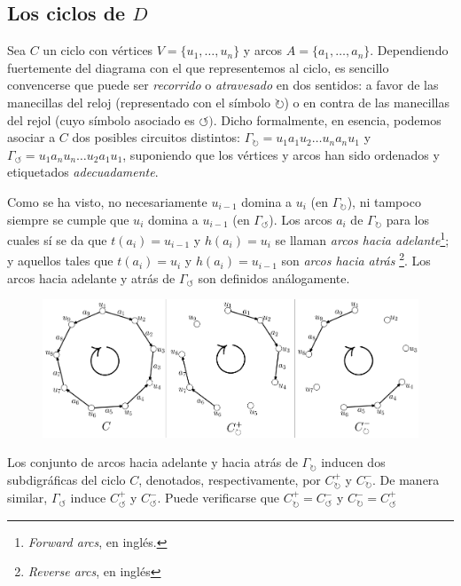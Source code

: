  \subsection{Los ciclos de $D$}
 
Sea $C$ un ciclo con vértices $V=\{u_{1}, \ldots, u_{n}\}$ y arcos $A=\{a_{1},\ldots, a_{n}\}$. Dependiendo fuertemente del diagrama con el que representemos al ciclo, es sencillo convencerse que puede ser \textit{recorrido} o \textit{atravesado} en dos sentidos: a favor de las manecillas del reloj (representado con el símbolo $\mathbf{\circlearrowright}$) o en contra de las manecillas del rejol (cuyo símbolo asociado es $\mathbf{\circlearrowleft})$. Dicho formalmente, en esencia, podemos asociar a $C$ dos posibles circuitos distintos: $\Gamma_{\mathbf{\circlearrowright}}=u_{1}a_{1}u_{2}\ldots u_{n}a_{n}u_{1}$ y $\Gamma_{\mathbf{\circlearrowleft}}=u_{1}a_{n}u_{n}\ldots u_{2}a_{1}u_{1}$, suponiendo que los vértices y arcos han sido ordenados y etiquetados \textit{adecuadamente}.

Como se ha visto, no necesariamente $u_{i-1}$ domina a $u_{i}$ (en $\Gamma_{\mathbf{\circlearrowright}}$), ni tampoco siempre se cumple que  $u_{i}$ domina a $u_{i-1}$ (en $\Gamma_{\mathbf{\circlearrowleft}}$). Los arcos $a_{i}$ de $\Gamma_{\mathbf{\circlearrowright}}$ para los cuales sí se da que $t(a_{i}) = u_{i-1}$ y $h(a_{i})=u_{i}$ se llaman \textit{arcos hacia adelante}\footnote{\textit{Forward arcs}, en inglés.}; y aquellos tales que $t(a_{i})=u_{i}$ y $h(a_{i})=u_{i-1}$ son \textit{arcos hacia atrás} \footnote{\textit{Reverse arcs}, en inglés}. Los arcos hacia adelante y atrás de $\Gamma_{\mathbf{\circlearrowleft}}$ son definidos análogamente.

\begin{figure}[H]
    \centering
    \includegraphics[scale=0.15]{img/imgchapter1/sentidociclos.jpg}
    \caption{}
    \label{fig:ciclosentidos}
\end{figure}

Los conjunto de arcos hacia adelante y hacia atrás de $\Gamma_{\mathbf{\circlearrowright}}$ inducen dos subdigráficas del ciclo $C$, denotados, respectivamente, por $C^{+}_{\mathbf{\circlearrowright}}$ y $C^{-}_{\mathbf{\circlearrowright}}$. De manera similar, $\Gamma_{\mathbf{\circlearrowleft}}$ induce $C^{+}_{\mathbf{\circlearrowleft}}$ y $C^{-}_{\mathbf{\circlearrowleft}}$. Puede verificarse que $C^{+}_{\mathbf{\circlearrowright}}=C^{-}_{\mathbf{\circlearrowleft}}$ y $C^{-}_{\mathbf{\circlearrowright}} = C^{+}_{\mathbf{\circlearrowleft}} $

